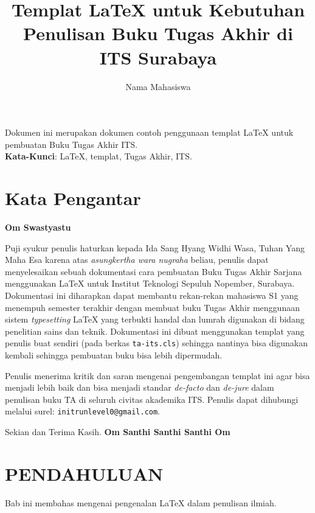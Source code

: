\documentclass{ta-scientics-matematika-its}
\title{Templat \LaTeX{} untuk Kebutuhan Penulisan Buku Tugas Akhir di ITS Surabaya}{A \LaTeX{} Template for Setting Up a Final Project Booklet for ITS Surabaya}{Kxxxxx}
\author{Nama Mahasiswa}{1234567890}
\begin{document}
    \frontmatter %
    \maketitle
    \legalityPaper %
    \begin{abstrak}
    	Dokumen ini merupakan dokumen contoh penggunaan templat \LaTeX{} untuk pembuatan Buku Tugas Akhir ITS. \\

    	\noindent \textbf{Kata-Kunci}: \LaTeX{}, templat, Tugas Akhir, ITS.
	\end{abstrak}
    \chapter{Kata Pengantar}
        \textbf{Om Swastyastu}

        Puji syukur penulis haturkan kepada Ida Sang Hyang Widhi Wasa, Tuhan Yang Maha Esa karena atas \emph{asungkertha wara nugraha} beliau, penulis dapat menyelesaikan sebuah dokumentasi cara pembuatan Buku Tugas Akhir Sarjana menggunakan \LaTeX{} untuk Institut Teknologi Sepuluh Nopember, Surabaya. Dokumentasi ini diharapkan dapat membantu rekan-rekan mahasiswa S1 yang menempuh semester terakhir dengan membuat buku Tugas Akhir menggunaan sistem \emph{typesetting} \LaTeX{} yang terbukti handal dan lumrah digunakan di bidang penelitian sains dan teknik. Dokumentasi ini dibuat menggunakan templat yang penulis buat sendiri (pada berkas \texttt{ta-its.cls}) sehingga nantinya bisa digunakan kembali sehingga pembuatan buku bisa lebih dipermudah.

        Penulis menerima kritik dan saran mengenai pengembangan templat ini agar bisa menjadi lebih baik dan bisa menjadi standar \emph{de-facto} dan \emph{de-jure} dalam penulisan buku TA di seluruh civitas akademika ITS. Penulis dapat dihubungi melalui surel: \texttt{initrunlevel0@gmail.com}.

        Sekian dan Terima Kasih.
        \noindent \textbf{Om Santhi Santhi Santhi Om}

        \cleardoublepage %

    \tableofcontents %
    \listoftables %
    \listoffigures %

\mainmatter %
    \chapter{PENDAHULUAN}
        Bab ini membahas mengenai pengenalan \LaTeX{} dalam penulisan ilmiah.
\end{document}
